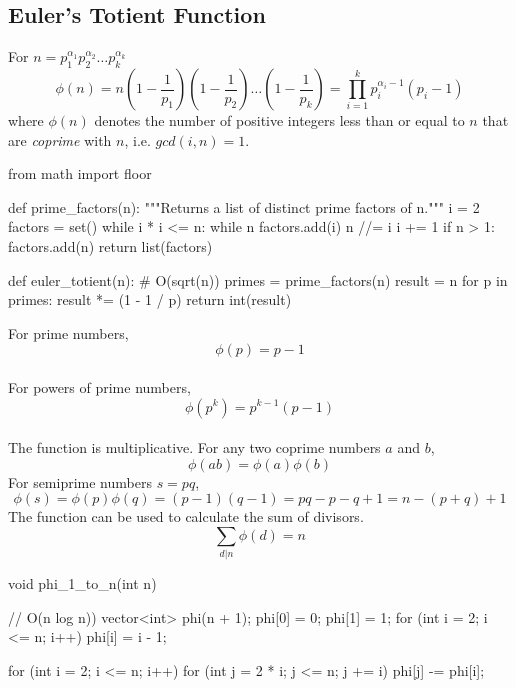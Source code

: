 \documentclass[12pt]{extarticle}
\begin{document}
\subsection*{Euler's Totient Function}
For $n=p_{1}^{\alpha_{1}}p_{2}^{\alpha_{2}}\dots p_{k}^{\alpha_{k}}$
$$\phi(n)=n(1-\frac{1}{p_{1}})(1-\frac{1}{p_{2}})\dots(1-\frac{1}{p_{k}})=\prod_{i=1}^{k}p_{i}^{\alpha_{i}-1}(p_{i}-1)$$
where $\phi(n)$ denotes the number of positive integers less than or equal to $n$ that are \emph{coprime} with $n$, i.e. $gcd(i, n)=1$. 
\begin{python}
from math import floor

def prime_factors(n):
    """Returns a list of distinct prime factors of n."""
    i = 2
    factors = set()
    while i * i <= n:
        while n %
            factors.add(i)
            n //= i
        i += 1
    if n > 1:
        factors.add(n)
    return list(factors)

def euler_totient(n): # O(sqrt(n))
    primes = prime_factors(n)
    result = n
    for p in primes:
        result *= (1 - 1 / p)
    return int(result)
\end{python}
For prime numbers, $$\phi(p)=p-1$$\\
For powers of prime numbers, $$\phi(p^{k})=p^{k-1}(p-1)$$ \\
The function is multiplicative. For any two coprime numbers $a$ and $b$, $$\phi(ab)=\phi(a)\phi(b)$$
For semiprime numbers $s=pq$, $$\phi(s)=\phi(p)\phi(q)=(p-1)(q-1)=pq-p-q+1=n-(p+q)+1$$
The function can be used to calculate the sum of divisors. 
$$\sum_{d|n}\phi(d)=n$$
\begin{cpp}
void phi_1_to_n(int n) { // O(n log n))
    vector<int> phi(n + 1);
    phi[0] = 0;
    phi[1] = 1;
    for (int i = 2; i <= n; i++)
        phi[i] = i - 1;

    for (int i = 2; i <= n; i++)
        for (int j = 2 * i; j <= n; j += i)
              phi[j] -= phi[i];
}
\end{cpp}
\end{document}
